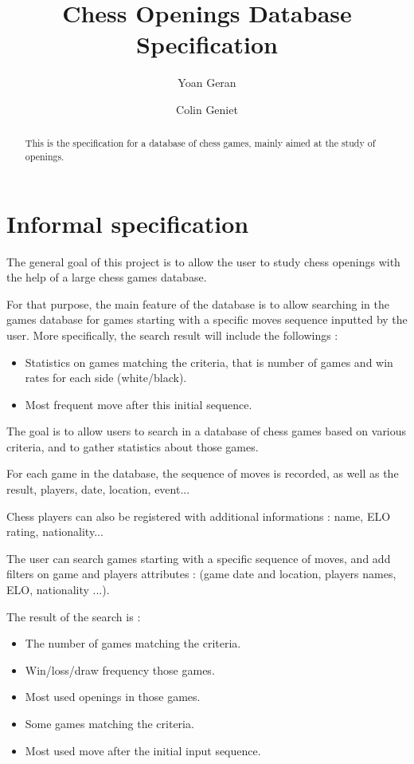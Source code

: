 \documentclass{article}
\begin{document}
\title{Chess Openings Database Specification}
\author{Yoan Geran \and Colin Geniet}
\maketitle

\begin{abstract}
This is the specification for a database of chess games, mainly aimed at
the study of openings.
\end{abstract}

\tableofcontents

\section{Informal specification}
The general goal of this project is to allow the user to study chess openings
with the help of a large chess games database.

For that purpose, the main feature of the database is to allow searching
in the games database for games starting with a specific moves sequence
inputted by the user.
More specifically, the search result will include the followings :
\begin{itemize}
\item Statistics on games matching the criteria, that is number of games and
win rates for each side (white/black).
\item Most frequent move after this initial sequence.
\end{itemize}







\newpage

The goal is to allow users to search in a database of chess games based on
various criteria, and to gather statistics about those games.

For each game in the database, the sequence of moves is recorded, as well as 
the result, players, date, location, event...

Chess players can also be registered with additional informations : name,
ELO rating, nationality...

The user can search games starting with a specific sequence of moves, and
add filters on game and players attributes : (game date and location,
players names, ELO, nationality ...).

The result of the search is :
\begin{itemize}
\item The number of games matching the criteria.
\item Win/loss/draw frequency those games.
\item Most used openings in those games.
\item Some games matching the criteria.
\item Most used move after the initial input sequence.
\end{itemize}
\end{document}
